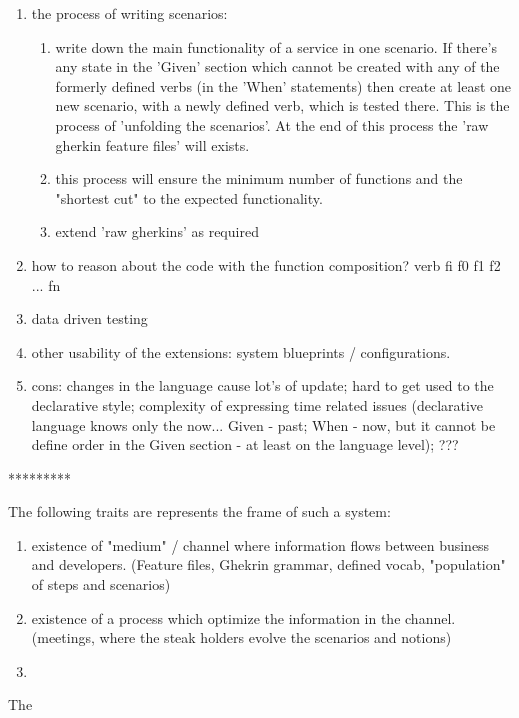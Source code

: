 \documentclass[conference]{IEEEtran}
\begin{document}
\begin{enumerate}
\begin{enumerate}
        \end{enumerate}
    \item the process of writing scenarios:
        \begin{enumerate}
            \item write down the main functionality of a service in one scenario. If there's any state in the 'Given' section which cannot be created with any of the formerly defined verbs (in the 'When' statements) then create at least one new scenario, with a newly defined verb, which is tested there. This is the process of 'unfolding the scenarios'. At the end of this process the 'raw gherkin feature files' will exists.
            \item this process will ensure the minimum number of functions and the "shortest cut" to the expected functionality.
            \item extend 'raw gherkins' as required
        \end{enumerate}
    \item how to reason about the code with the function composition? verb 	\Rightarrow fi \Rightarrow f0 \circ f1 \circ f2 \circ ... \circ fn
    \item data driven testing
    \item other usability of the extensions: system blueprints / configurations.
    \item cons: changes in the language cause lot's of update; hard to get used to the declarative style; complexity of expressing time related issues (declarative language knows only the now... Given - past; When - now, but it cannot be define order in the Given section - at least on the language level); ???
\end{enumerate}


*********

The following traits are represents the frame of such a system:
\begin{enumerate}
  \item existence of "medium" / channel where information flows between business and developers. (Feature files, Ghekrin grammar, defined vocab, "population" of steps and scenarios)
  \item existence of a process which optimize the information in the channel. (meetings, where the steak holders evolve the scenarios and notions)
  \item 
\end{enumerate}

The 
\end{document}
